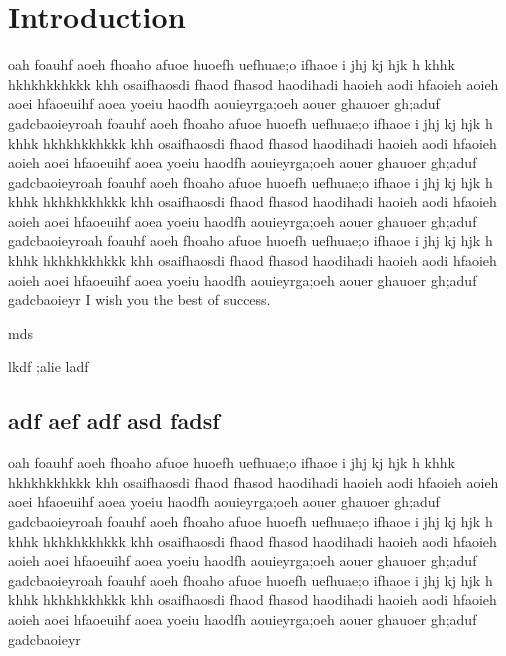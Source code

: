 \documentclass[journal]{IEEEtran}
\begin{document}
\section{Introduction}
% 
% 
% 
% 
 oah foauhf aoeh fhoaho  afuoe huoefh uefhuae;o ifhaoe i jhj kj hjk h khhk hkhkhkkhkkk khh  osaifhaosdi fhaod fhasod haodihadi haoieh aodi hfaoieh aoieh aoei hfaoeuihf aoea yoeiu haodfh aouieyrga;oeh aouer ghauoer gh;aduf gadcbaoieyroah foauhf aoeh fhoaho  afuoe huoefh uefhuae;o ifhaoe i jhj kj hjk h khhk hkhkhkkhkkk khh  osaifhaosdi fhaod fhasod haodihadi haoieh aodi hfaoieh aoieh aoei hfaoeuihf aoea yoeiu haodfh aouieyrga;oeh aouer ghauoer gh;aduf gadcbaoieyroah foauhf aoeh fhoaho  afuoe huoefh uefhuae;o ifhaoe i jhj kj hjk h khhk hkhkhkkhkkk khh  osaifhaosdi fhaod fhasod haodihadi haoieh aodi hfaoieh aoieh aoei hfaoeuihf aoea yoeiu haodfh aouieyrga;oeh aouer ghauoer gh;aduf gadcbaoieyroah foauhf aoeh fhoaho  afuoe huoefh uefhuae;o ifhaoe i jhj kj hjk h khhk hkhkhkkhkkk khh  osaifhaosdi fhaod fhasod haodihadi haoieh aodi hfaoieh aoieh aoei hfaoeuihf aoea yoeiu haodfh aouieyrga;oeh aouer ghauoer gh;aduf gadcbaoieyr
I wish you the best of success.

\hfill mds
 
\hfill lkdf ;alie ladf

\subsection{adf aef adf asd fadsf}
oah foauhf aoeh fhoaho  afuoe huoefh uefhuae;o ifhaoe i jhj kj hjk h khhk hkhkhkkhkkk khh  osaifhaosdi fhaod fhasod haodihadi haoieh aodi hfaoieh aoieh aoei hfaoeuihf aoea yoeiu haodfh aouieyrga;oeh aouer ghauoer gh;aduf gadcbaoieyroah foauhf aoeh fhoaho  afuoe huoefh uefhuae;o ifhaoe i jhj kj hjk h khhk hkhkhkkhkkk khh  osaifhaosdi fhaod fhasod haodihadi haoieh aodi hfaoieh aoieh aoei hfaoeuihf aoea yoeiu haodfh aouieyrga;oeh aouer ghauoer gh;aduf gadcbaoieyroah foauhf aoeh fhoaho  afuoe huoefh uefhuae;o ifhaoe i jhj kj hjk h khhk hkhkhkkhkkk khh  osaifhaosdi fhaod fhasod haodihadi haoieh aodi hfaoieh aoieh aoei hfaoeuihf aoea yoeiu haodfh aouieyrga;oeh aouer ghauoer gh;aduf gadcbaoieyr
\end{document}
